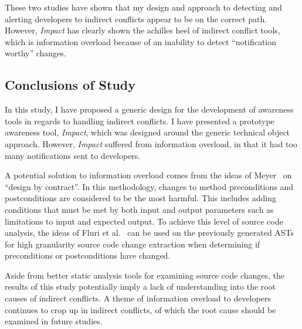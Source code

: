 These two studies have shown that my design and approach to
detecting and alerting developers to indirect conflicts appear
to be on the correct path. However, \textit{Impact} has clearly shown
the achilles heel of indirect conflict tools, which is information
overload because of an inability to detect ``notification worthy''
changes.

\subsection{Conclusions of Study}
\label{sec:ns}
In this study, I have proposed a generic 
design for the development of awareness tools in regards to
handling indirect conflicts. I have presented a prototype 
awareness tool, \textit{Impact}, which was designed around the generic 
technical object approach. However, \textit{Impact} suffered from
information overload, in that it had too many notifications sent to
developers.

A potential solution to information overload comes from the ideas of
Meyer~\cite{Meyer:1988} on ``design by contract''. In this methodology, changes to method
preconditions and postconditions are considered to be the most harmful. 
This includes adding conditions that must be met by both input
and output parameters such as limitations to input and expected
output. To achieve this level of source code analysis, the ideas of
Fluri et al.~\cite{Fluri:2007:CDT} can be used on the previously generated
ASTs for high granularity
source code change extraction when determining if preconditions or
postconditions have changed.

Aside from better static analysis tools for examining source code changes,
the results of this study potentially imply a lack of understanding into the
root causes of indirect conflicts.  A theme of information overload to developers
continues to crop up in indirect conflicts, of which the root cause should
be examined in future studies.